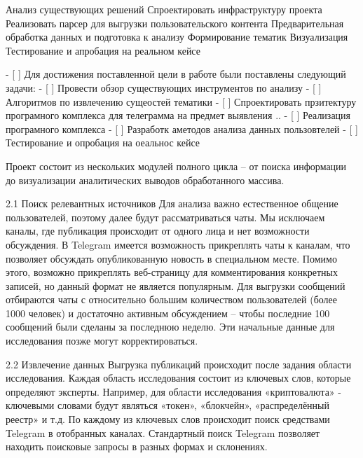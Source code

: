 \documentclass[a4paper,article,14pt]{extarticle}
\begin{document}

Анализ существующих решений
Спроектировать инфраструктуру проекта
Реализовать парсер для выгрузки пользовательского контента
Предварительная обработка данных и подготовка к анализу
Формирование тематик
Визуализация
Тестирование и апробация на реальном кейсе



   - [ ] Для достижения поставленной цели в работе были поставлены следующий задачи:
    - [ ] Провести обзор существующих инструментов по анализу
    - [ ] Алгоритмов по извлечению сущеостей тематики
    - [ ] Спроектировать прзитектуру програмного комплекса для телеграмма на предмет выявления ..
    - [ ] Реализация програмного комплекса
    - [ ] Разработк аметодов анализа данных пользовтелей
    - [ ] Тестирование и опробация на оеальнос кейсе



Проект состоит из нескольких модулей полного цикла – от поиска информации до визуализации аналитических выводов обработанного массива.

2.1 Поиск релевантных источников
Для анализа важно естественное общение пользователей, поэтому далее будут рассматриваться чаты. Мы исключаем каналы, где публикация происходит от одного лица и нет возможности обсуждения.
В Telegram имеется возможность прикреплять чаты к каналам, что позволяет обсуждать опубликованную новость в специальном месте. Помимо этого, возможно прикреплять веб-страницу для комментирования конкретных записей, но данный формат не является популярным.
Для выгрузки сообщений отбираются чаты с относительно большим количеством пользователей (более 1000 человек) и достаточно активным обсуждением – чтобы последние 100 сообщений были сделаны за последнюю неделю. Эти начальные данные для исследования позже могут корректироваться.

2.2 Извлечение данных
Выгрузка публикаций происходит после задания области исследования. Каждая область исследования состоит из ключевых слов, которые определяют эксперты. Например, для области исследования «криптовалюта» - ключевыми словами будут являться «токен», «блокчейн», «распределённый реестр» и т.д.
По каждому из ключевых слов происходит поиск средствами Telegram в отобранных каналах. Стандартный поиск Telegram позволяет находить поисковые запросы в разных формах и склонениях.
\end{document}
